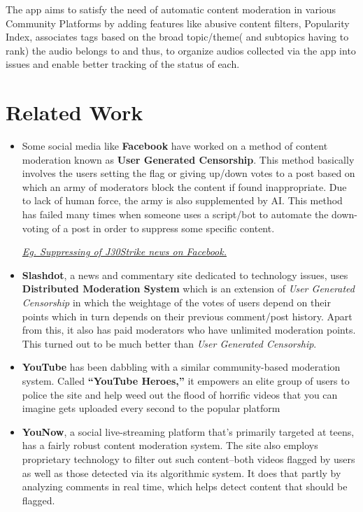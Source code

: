 \documentclass[11pt]{article}
\begin{document}
\bigskip

The app aims to satisfy the need of automatic content moderation in various Community Platforms by adding features like abusive content filters, Popularity Index, associates tags based on the broad topic/theme( and subtopics having to rank) the audio belongs to and thus, to organize audios collected via the app into issues and enable better tracking of the status of each.


\section{Related Work}
    \begin{itemize}
        \item Some social media like \textbf{Facebook} have worked on a method of content moderation known as \textbf{User Generated Censorship}. This method basically involves the users setting the flag or giving up/down votes to a post based on which an army of moderators block the content if found inappropriate. Due to lack of human force, the army is also supplemented by AI. This method has failed many times when someone uses a script/bot to automate the down-voting of a post in order to suppress some specific content. 
        
        \textit\underline{{Eg. Suppressing of J30Strike news on Facebook.}}
        
        \item \textbf{Slashdot}, a news and commentary site dedicated to technology issues, uses \textbf{Distributed Moderation System} which is an extension of \textit{User Generated Censorship} in which the weightage of the votes of users depend on their points which in turn depends on their previous comment/post history. Apart from this, it also has paid moderators who have unlimited moderation points. This turned out to be much better than \textit{User Generated Censorship}.
        
        \item \textbf{YouTube} has been dabbling with a similar community-based moderation system. Called \textbf{“YouTube Heroes,”} it empowers an elite group of users to police the site and help weed out the flood of horrific videos that you can imagine gets uploaded every second to the popular platform
        
        \item \textbf{YouNow}, a social live-streaming platform that’s primarily targeted at teens, has a fairly robust content moderation system. The site also employs proprietary technology to filter out such content–both videos flagged by users as well as those detected via its algorithmic system. It does that partly by analyzing comments in real time, which helps detect content that should be flagged.
        

\end{itemize}
\end{document}
